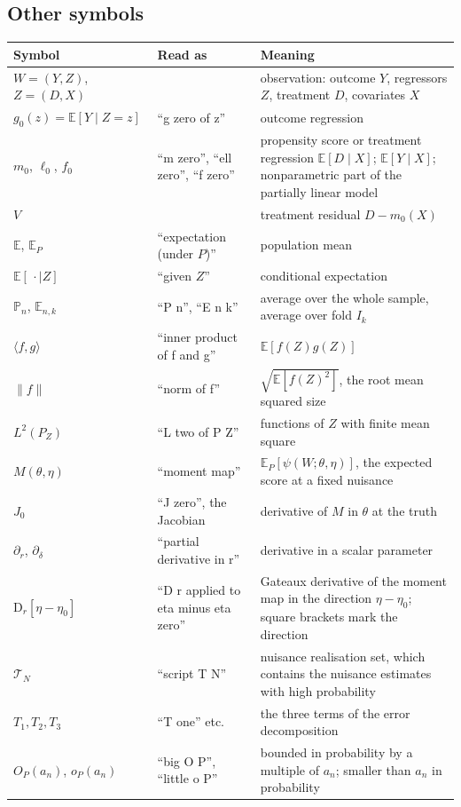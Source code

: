 \documentclass[11pt]{article}
\newcommand{\E}{\mathbb{E}}
\begin{document}
\subsection{Other symbols}

\begin{longtable}{@{}l p{4cm} p{7.4cm}@{}}
\toprule
Symbol & Read as & Meaning\\
\midrule
\endhead
$W=(Y,Z)$, $Z=(D,X)$ & & observation: outcome $Y$, regressors $Z$, treatment $D$, covariates $X$\\
$g_0(z)=\E[Y\mid Z=z]$ & ``g zero of z'' & outcome regression\\
$m_0$, $\ell_0$, $f_0$ & ``m zero'', ``ell zero'', ``f zero'' & propensity score or treatment regression $\E[D\mid X]$; $\E[Y\mid X]$; nonparametric part of the partially linear model\\
$V$ & & treatment residual $D-m_0(X)$\\
$\E$, $\E_P$ & ``expectation (under $P$)'' & population mean\\
$\E[\,\cdot\mid Z]$ & ``given $Z$'' & conditional expectation\\
$\mathbb P_n$, $\E_{n,k}$ & ``P n'', ``E n k'' & average over the whole sample, average over fold $I_k$\\
$\langle f,g\rangle$ & ``inner product of f and g'' & $\E[f(Z)g(Z)]$\\
$\|f\|$ & ``norm of f'' & $\sqrt{\E[f(Z)^2]}$, the root mean squared size\\
$L^2(P_Z)$ & ``L two of P Z'' & functions of $Z$ with finite mean square\\
$M(\theta,\eta)$ & ``moment map'' & $\E_P[\psi(W;\theta,\eta)]$, the expected score at a fixed nuisance\\
$J_0$ & ``J zero'', the Jacobian & derivative of $M$ in $\theta$ at the truth\\
$\partial_r$, $\partial_\delta$ & ``partial derivative in r'' & derivative in a scalar parameter\\
$\mathrm D_r[\eta-\eta_0]$ & ``D r applied to eta minus eta zero'' & Gateaux derivative of the moment map in the direction $\eta-\eta_0$; square brackets mark the direction\\
$\mathcal T_N$ & ``script T N'' & nuisance realisation set, which contains the nuisance estimates with high probability\\
$T_1,T_2,T_3$ & ``T one'' etc. & the three terms of the error decomposition\\
$O_P(a_n)$, $o_P(a_n)$ & ``big O P'', ``little o P'' & bounded in probability by a multiple of $a_n$; smaller than $a_n$ in probability\\

\end{longtable}
\end{document}
